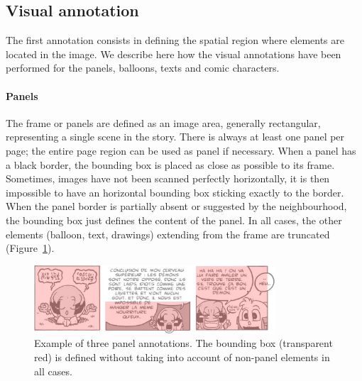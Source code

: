 
\subsection{Visual annotation} %
\label{sub:visual_annotation}
The first annotation consists in defining the spatial region where elements are located in the image.
We describe here how the visual annotations have been performed for the panels, balloons, texts and comic characters.

\paragraph{Panels} %
\label{par:panels}
The frame or panels are defined as an image area, generally rectangular, representing a single scene in the story. 
There is always at least one panel per page; the entire page region can be used as panel if necessary.
When a panel has a black border, the bounding box is placed as close as possible to its frame.
Sometimes, images have not been scanned perfectly horizontally, it is then impossible to have an horizontal bounding box sticking exactly to the border.
When the panel border is partially absent or suggested by the neighbourhood, the bounding box just defines the content of the panel.
In all cases, the other elements (balloon, text, drawings) extending from the frame are truncated (Figure~\ref{fig:gt:segPanel}).

\begin{figure}[h!]
\begin{center}
\includegraphics[width=0.8\textwidth]{segPanel.png}
\caption[Panel annotation]{Example of three panel annotations. The bounding box (transparent red) is defined without taking into account of non-panel elements in all cases.}
\label{fig:gt:segPanel}
\end{center}
\end{figure}

